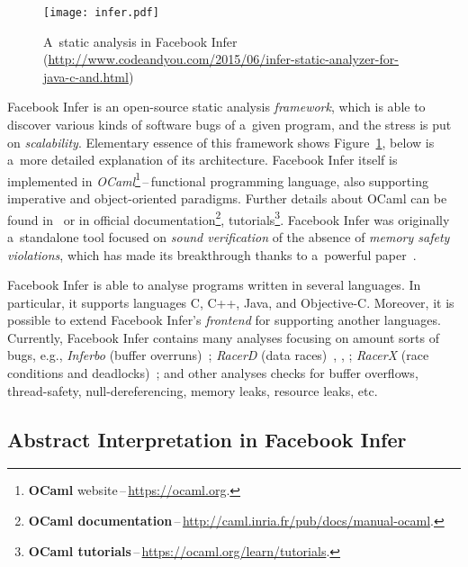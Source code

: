 \begin{figure}[hbt]
    \centering
    \texttt{[image: infer.pdf]}
    \caption{
        A~static analysis in Facebook Infer
        (\url{http://www.codeandyou.com/2015/06/infer-static-analyzer-for-java-c-and.html})
    }
    \label{fig:infer}
\end{figure}

Facebook Infer is an open-source static analysis \emph{framework},
which is able to discover various kinds of software bugs of a~given
program, and the stress is put on \emph{scalability}.
Elementary essence of this framework shows Figure~\ref{fig:infer}, below
is a~more detailed explanation of its architecture. Facebook Infer
itself is implemented in \emph{OCaml}\footnote{\textbf{OCaml}
website\,--\,\url{https://ocaml.org}.}\,--\,functional programming
language, also supporting imperative and object-oriented paradigms. Further
details about OCaml can be found in~\cite{realWorldOCaml} or in
official documentation\footnote{\textbf{OCaml
documentation}\,--\,\url{http://caml.inria.fr/pub/docs/manual-ocaml}.},
tutorials\footnote{\textbf{OCaml
tutorials}\,--\,\url{https://ocaml.org/learn/tutorials}.}. Facebook Infer was
originally a~standalone tool focused on \emph{sound verification} of
the absence of \emph{memory safety violations}, which has made its breakthrough
thanks to a~powerful paper~\cite{inferBiabduction}.

Facebook Infer is able to analyse programs written in several languages.
In particular, it supports languages C, C++, Java, and Objective-C. Moreover,
it is possible to extend Facebook Infer's \emph{frontend} for supporting
another languages. Currently, Facebook Infer contains many analyses focusing
on amount sorts of bugs, e.g., \emph{Inferbo} (buffer
overruns)~\cite{inferboOnline}; \emph{RacerD} (data races)~\cite{racerD},
\cite{racerDOnline}, \cite{staticRaceDetectorTruePositive}; \emph{RacerX}
(race conditions and deadlocks)~\cite{racerX}; and other analyses checks
for buffer overflows, thread-safety, null-dereferencing, memory leaks,
resource leaks, etc.


\subsection{Abstract Interpretation in Facebook Infer}

